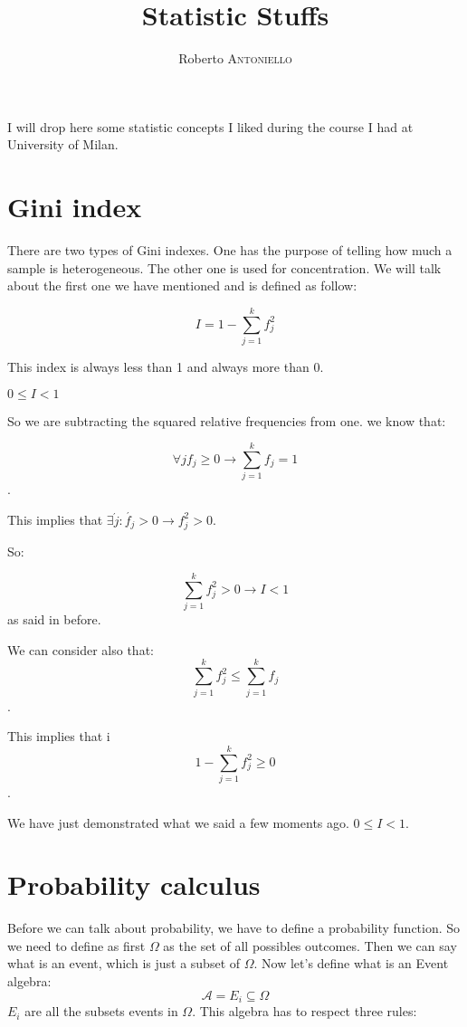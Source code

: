 \documentclass{article}
\title{Statistic Stuffs}
\author{Roberto \textsc{Antoniello}}
\begin{document}
\maketitle

\begin{center} I will drop here some statistic concepts I liked during the course I had at University of Milan.\end{center}

\section{Gini index}

There are two types of Gini indexes. One has the purpose of telling how much a sample is heterogeneous. The other one is used for concentration. We will talk about the first one we have mentioned and is defined as follow:
\begin{center}$$I = 1 - \sum_{j=1}^{k}f_j^2$$\end{center}

This index is always less than 1 and always more than 0.

\begin{center}$0 \leq I < 1$\end{center}

So we are subtracting the squared relative frequencies from one. we know that: 
\begin{center}$$\forall j f_j \ge 0 \longrightarrow \sum_{j=1}^k f_j = 1$$.\end{center}

This implies that $\exists \acute{j} : \acute{f_j} > 0 \longrightarrow f_j^2 > 0$.

So: \begin{center}$$\sum_{j=1}^k f_j^2 > 0 \longrightarrow I < 1$$ as said in before.\end{center}

We can consider also that: $$\sum_{j=1}^kf_j^2 \le \sum_{j=1}^kf_j$$.

This implies that i$$1 - \sum_{j=1}^kf_j^2 \ge 0$$.

We have just demonstrated what we said a few moments ago. $0 \leq I < 1$.  

\section{Probability calculus}

Before we can talk about probability, we have to define a probability function. So we need to define as first $\Omega$ as the set of all possibles outcomes. Then we can say what is an event, which is just a subset of $\Omega$. Now let's define what is an Event algebra:
$$\mathcal{A} = {E_i \subseteq \Omega}$$
$E_i$ are all the subsets events in $\Omega$. This algebra has to respect three rules:
\end{document}
